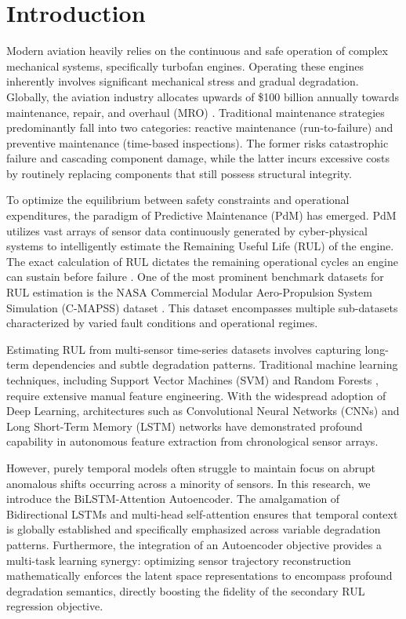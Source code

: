 \documentclass[conference]{IEEEtran}
\begin{document}
\section{Introduction}
Modern aviation heavily relies on the continuous and safe operation of complex mechanical systems, specifically turbofan engines. Operating these engines inherently involves significant mechanical stress and gradual degradation. Globally, the aviation industry allocates upwards of \$100 billion annually towards maintenance, repair, and overhaul (MRO) \cite{intro1}. Traditional maintenance strategies predominantly fall into two categories: reactive maintenance (run-to-failure) and preventive maintenance (time-based inspections). The former risks catastrophic failure and cascading component damage, while the latter incurs excessive costs by routinely replacing components that still possess structural integrity.

To optimize the equilibrium between safety constraints and operational expenditures, the paradigm of Predictive Maintenance (PdM) has emerged. PdM utilizes vast arrays of sensor data continuously generated by cyber-physical systems to intelligently estimate the Remaining Useful Life (RUL) of the engine. The exact calculation of RUL dictates the remaining operational cycles an engine can sustain before failure \cite{intro2}. One of the most prominent benchmark datasets for RUL estimation is the NASA Commercial Modular Aero-Propulsion System Simulation (C-MAPSS) dataset \cite{cmapss_original}. This dataset encompasses multiple sub-datasets characterized by varied fault conditions and operational regimes.

Estimating RUL from multi-sensor time-series datasets involves capturing long-term dependencies and subtle degradation patterns. Traditional machine learning techniques, including Support Vector Machines (SVM) \cite{svm_rul} and Random Forests \cite{rf_rul}, require extensive manual feature engineering. With the widespread adoption of Deep Learning, architectures such as Convolutional Neural Networks (CNNs) \cite{cnn_rul} and Long Short-Term Memory (LSTM) networks \cite{lstm_rul} have demonstrated profound capability in autonomous feature extraction from chronological sensor arrays.

However, purely temporal models often struggle to maintain focus on abrupt anomalous shifts occurring across a minority of sensors. In this research, we introduce the BiLSTM-Attention Autoencoder. The amalgamation of Bidirectional LSTMs and multi-head self-attention ensures that temporal context is globally established and specifically emphasized across variable degradation patterns. Furthermore, the integration of an Autoencoder objective provides a multi-task learning synergy: optimizing sensor trajectory reconstruction mathematically enforces the latent space representations to encompass profound degradation semantics, directly boosting the fidelity of the secondary RUL regression objective.
\end{document}

